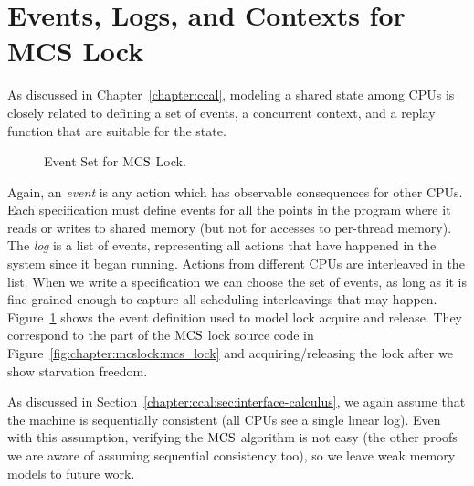 \section{Events, Logs, and  Contexts for MCS Lock}
\label{chapter:mcslock:sec:eventlogandoracle}

As discussed in Chapter~\ref{chapter:ccal}, 
modeling a shared state among CPUs is 
closely related to defining a set of events, a concurrent context, and a replay function that are suitable for
the state.
\begin{figure}
\begin{minipage}{\linewidth}

\end{minipage}
\caption{Event Set for $\mathrm{MCS}$ Lock.}
\label{fig:chapter:mcslock:lock_event_type}
\end{figure}
Again, an \emph{event} is any action which has observable consequences for
other CPUs. Each specification must define events for all the points
in the program where it reads or writes to shared memory (but not for
accesses to per-thread memory). The \emph{log} is a list of
events, representing all actions that have happened in the system
since it began running. Actions from different CPUs are interleaved in
the list.
When we write a specification we can choose the set of events, as long
as it is fine-grained enough to capture all scheduling interleavings
that may happen.
Figure~\ref{fig:chapter:mcslock:lock_event_type} shows the event definition used to
model lock acquire and release. They correspond to the part of the $\mathrm{MCS}$ lock source code in Figure~\ref{fig:chapter:mcslock:mcs_lock}
and acquiring/releasing the lock after we show starvation freedom. 


As discussed in Section~\ref{chapter:ccal:sec:interface-calculus},  we again assume that the
machine is sequentially consistent (all CPUs see a single linear log). 
Even with this assumption,
verifying the $\mathrm{MCS}$ algorithm is not easy (the other proofs we are aware
of assuming sequential consistency too), so we leave weak memory models
to future work.


